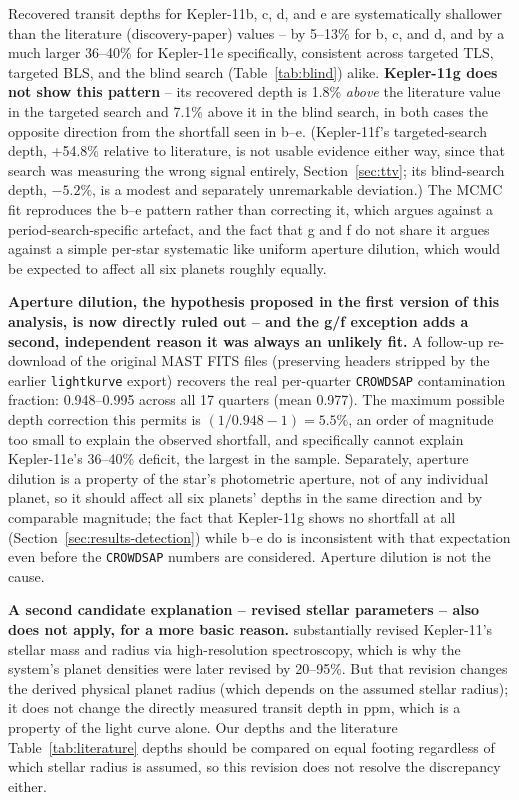 \documentclass[11pt]{article}
\begin{document}
Recovered transit depths for Kepler-11b, c, d, and e are systematically shallower than the literature (discovery-paper) values -- by 5--13\% for b, c, and d, and by a much larger 36--40\% for Kepler-11e specifically, consistent across targeted TLS, targeted BLS, and the blind search (Table~\ref{tab:blind}) alike. \textbf{Kepler-11g does not show this pattern} -- its recovered depth is 1.8\% \emph{above} the literature value in the targeted search and 7.1\% above it in the blind search, in both cases the opposite direction from the shortfall seen in b--e. (Kepler-11f's targeted-search depth, +54.8\% relative to literature, is not usable evidence either way, since that search was measuring the wrong signal entirely, Section~\ref{sec:ttv}; its blind-search depth, $-5.2\%$, is a modest and separately unremarkable deviation.) The MCMC fit reproduces the b--e pattern rather than correcting it, which argues against a period-search-specific artefact, and the fact that g and f do not share it argues against a simple per-star systematic like uniform aperture dilution, which would be expected to affect all six planets roughly equally.

\textbf{Aperture dilution, the hypothesis proposed in the first version of this analysis, is now directly ruled out -- and the g/f exception adds a second, independent reason it was always an unlikely fit.} A follow-up re-download of the original MAST FITS files (preserving headers stripped by the earlier \texttt{lightkurve} export) recovers the real per-quarter \texttt{CROWDSAP} contamination fraction: 0.948--0.995 across all 17 quarters (mean 0.977). The maximum possible depth correction this permits is $(1/0.948 - 1) = 5.5\%$, an order of magnitude too small to explain the observed shortfall, and specifically cannot explain Kepler-11e's 36--40\% deficit, the largest in the sample. Separately, aperture dilution is a property of the star's photometric aperture, not of any individual planet, so it should affect all six planets' depths in the same direction and by comparable magnitude; the fact that Kepler-11g shows no shortfall at all (Section~\ref{sec:results-detection}) while b--e do is inconsistent with that expectation even before the \texttt{CROWDSAP} numbers are considered. Aperture dilution is not the cause.

\textbf{A second candidate explanation -- revised stellar parameters -- also does not apply, for a more basic reason.} \citet{Bedell2017} substantially revised Kepler-11's stellar mass and radius via high-resolution spectroscopy, which is why the system's planet densities were later revised by 20--95\%. But that revision changes the derived physical planet radius (which depends on the assumed stellar radius); it does not change the directly measured transit depth in ppm, which is a property of the light curve alone. Our depths and the literature Table~\ref{tab:literature} depths should be compared on equal footing regardless of which stellar radius is assumed, so this revision does not resolve the discrepancy either.
\end{document}
